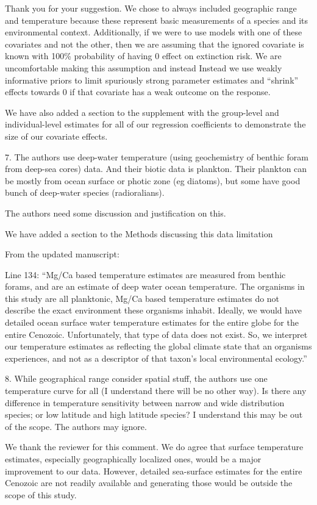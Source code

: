\documentclass[12pt,letterpaper]{article}
\begin{document}
\begin{refsection}
Thank you for your suggestion. We chose to always included geographic range and temperature because these represent basic measurements of a species and its environmental context. Additionally, if we were to use models with one of these covariates and not the other, then we are assuming that the ignored covariate is known with 100\% probability of having 0 effect on extinction risk. We are uncomfortable making this assumption and instead Instead we use weakly informative priors to limit spuriously strong parameter estimates and ``shrink'' effects towards 0 if that covariate has a weak outcome on the response.

We have also added a section to the supplement with the group-level and individual-level estimates for all of our regression coefficients to demonstrate the size of our covariate effects.

\begin{bfseries}
  7. The authors use deep-water temperature (using geochemistry of benthic foram from deep-sea cores) data. And their biotic data is plankton. Their plankton can be mostly from ocean surface or photic zone (eg diatoms), but some have good bunch of deep-water species (radioralians).

  The authors need some discussion and justification on this.
\end{bfseries}

We have added a section to the Methods discussing this data limitation

From the updated manuscript:

Line 134: ``Mg/Ca based temperature estimates are measured from benthic forams, and are an estimate of deep water ocean temperature. The organisms in this study are all planktonic, Mg/Ca based temperature estimates do not describe the exact environment these organisms inhabit. Ideally, we would have detailed ocean surface water temperature estimates for the entire globe for the entire Cenozoic. Unfortunately, that type of data does not exist. So, we interpret our temperature estimates as reflecting the global climate state that an organisms experiences, and not as a descriptor of that taxon's local environmental ecology.''


\begin{bfseries}
  8. While geographical range consider spatial stuff, the authors use one temperature curve for all (I understand there will be no other way). Is there any difference in temperature sensitivity between narrow and wide distribution species; or low latitude and high latitude species? I understand this may be out of the scope. The authors may ignore.
\end{bfseries}

We thank the reviewer for this comment. We do agree that surface temperature estimates, especially geographically localized ones, would be a major improvement to our data. However, detailed sea-surface estimates for the entire Cenozoic are not readily available and generating those would be outside the scope of this study.







\printbibliography
\end{refsection}
\end{document}
